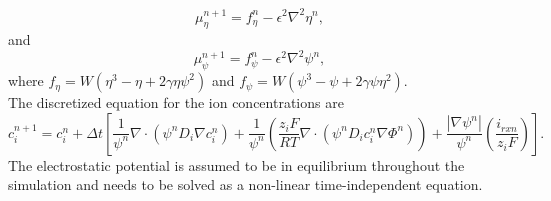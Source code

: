 \documentclass[11pt]{article}
\renewcommand{\=}[1]{\stackrel{#1}{=}} %
\theoremstyle{definition}
\theoremstyle{remark}
\begin{document}
\begin{equation}
\label{mueta_eq_td}
\mu_\eta^{n+1}=f_\eta^n -\epsilon^2 \nabla^2 \eta^n,
\end{equation}
and
\begin{equation}
\label{mupsi_eq_td}
\mu_\psi^{n+1}=f_\psi^n -\epsilon^2 \nabla^2 \psi^n,
\end{equation}
where $f_\eta=W \left( \eta^3 - \eta +2 \gamma \eta \psi^2 \right)$ and $f_\psi= W \left( \psi^3 - \psi +2 \gamma \psi  \eta^2 \right)$.\\
The discretized equation for the ion concentrations are
\begin{equation}
\label{conc_eq_td}
c_i ^{n+1}= c_i^n  + \Delta t  \left[ \frac{1}{\psi^n} \nabla \cdot (\psi^n D_i \nabla c_i^n) + \frac{1}{\psi^n} \left( \frac{z_i F}{RT} \nabla \cdot (\psi^n D_i c_i^n \nabla \Phi^n) \right)+ \frac{|\nabla \psi^n|}{\psi^n} \left( \frac{i_{rxn}}{z_i F} \right) \right].
\end{equation}
The electrostatic potential is assumed to be in equilibrium throughout the simulation and needs to be solved as a non-linear time-independent equation.
\end{document}
